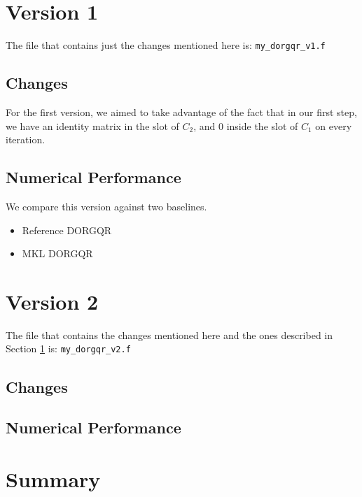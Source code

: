 \documentclass{article}
\begin{document}
\section{Version 1}\label{sec:v1}
The file that contains just the changes mentioned here is: \verb|my_dorgqr_v1.f|
\subsection{Changes}
For the first version, we aimed to take advantage of the fact that in our first step, we have an identity matrix 
in the slot of $C_2$, and $0$ inside the slot of $C_1$ on every iteration.
\subsection{Numerical Performance}
We compare this version against two baselines. 
\begin{itemize}
    \item Reference DORGQR
    \item MKL DORGQR
\end{itemize}
\section{Version 2}
The file that contains the changes mentioned here and the ones described in Section \ref{sec:v1} is: \verb|my_dorgqr_v2.f|
\subsection{Changes}
\subsection{Numerical Performance}
\section{Summary}
\end{document}
